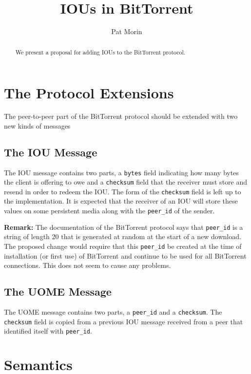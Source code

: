 \documentclass[lotsofwhite]{patmorin}
\title{IOUs in BitTorrent}
\author{Pat Morin}
\newcommand{\field}[1]{\texttt{#1}}
\begin{document}
\maketitle

\begin{abstract}
We present a proposal for adding IOUs to the BitTorrent protocol.
\end{abstract}


\section{The Protocol Extensions}

The peer-to-peer part of the BitTorrent protocol should be extended
with two new kinds of messages

\subsection{The IOU Message}

The IOU message contains two parts, a \field{bytes} field indicating
how many bytes the client is offering to owe and a \field{checksum}
field that the receiver must store and resend in order to redeem the
IOU.  The form of the \field{checksum} field is left up to the
implementation. It is expected that the receiver of an IOU will store
these values on some persistent media along with the \field{peer\_id}
of the sender.

\noindent\textbf{Remark:}  The documentation of the BitTorrent
protocol says that \field{peer\_id} is a string of length 20 that is
generated at random at the start of a new download.   The proposed
change would require that this \field{peer\_id} be created at the time
of installation (or first use) of BitTorrent and continue to be used
for all BitTorrent connections.  This does not seem to cause any
problems.

\subsection{The UOME Message}

The UOME message contains two parts, a \field{peer\_id} and a
\field{checksum}.  The \field{checksum} field is copied from a
previous IOU message received from a peer that identified itself with
\field{peer\_id}.

\section{Semantics}
\end{document}
